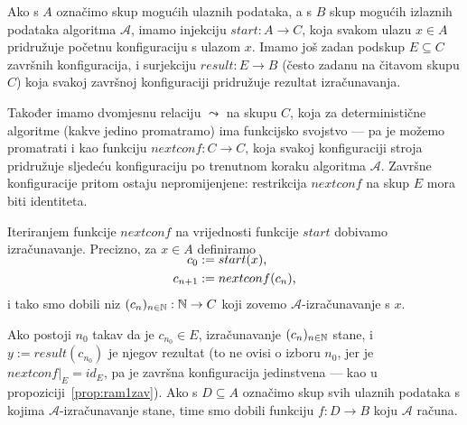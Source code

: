 Ako s $A$ označimo skup mogućih ulaznih podataka, a s $B$ skup mogućih izlaznih podataka algoritma $\mathcal A$, imamo injekciju $start:A\to C$, koja svakom ulazu $x\in A$ pridružuje početnu konfiguraciju s ulazom $x$. Imamo još zadan podskup $E\subseteq C$ završnih konfiguracija, i surjekciju $result:E\to B$ (često zadanu na čitavom skupu $C$) koja svakoj završnoj konfiguraciji pridružuje rezultat izračunavanja.

Također imamo dvomjesnu relaciju $\leadsto$ na skupu $C$, koja za deterministične algoritme (kakve jedino promatramo) ima funkcijsko svojstvo --- pa je možemo promatrati i kao funkciju $nextconf:C\to C$, koja svakoj konfiguraciji stroja pridružuje sljedeću konfiguraciju po trenutnom koraku algoritma $\mathcal A$. Završne konfiguracije pritom ostaju nepromijenjene: restrikcija $nextconf$ na skup $E$ mora biti identiteta.

Iteriranjem funkcije $nextconf$ na vrijednosti funkcije $start$ dobivamo izračunavanje. Precizno, za $x\in A$ definiramo
\begin{align}
\SwapAboveDisplaySkip
    c_0&:=start(x)\text,\\
    c_{n+1}&:=nextconf(c_n)\text,
\end{align}
i tako smo dobili niz $(c_n)_{n\in{\mathbb N}}:{\mathbb N}\to C$ koji zovemo $\mathcal A$-izračunavanje s $x$.

Ako postoji $n_0$ takav da je $c_{n_0}\in E$, izračunavanje $(c_n)_{n\in{\mathbb N}}$ stane, i $y:=result(c_{n_0})$ je njegov rezultat (to ne ovisi o izboru $n_0$, jer je $nextconf|_E=id_E$, pa je završna konfiguracija jedinstvena --- kao u propoziciji~\ref{prop:ram1zav}). Ako s $D\subseteq A$ označimo skup svih ulaznih podataka s kojima $\mathcal A$-izračunavanje stane, time smo dobili funkciju $f:D\to B$ koju $\mathcal A$ računa.

